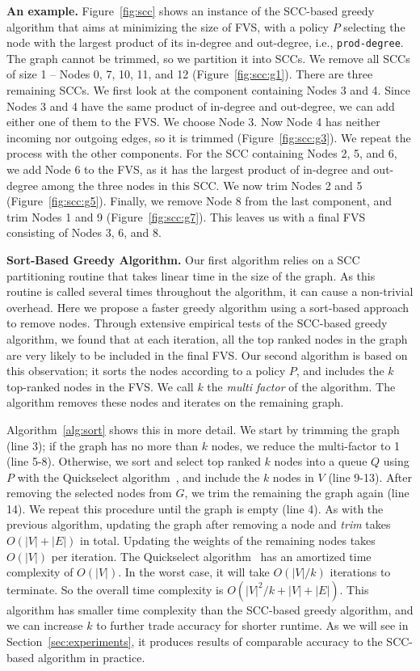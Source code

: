 {\bf An example.} Figure~\ref{fig:scc} shows an instance of the SCC-based greedy algorithm that aims at minimizing the size of FVS, with a policy $P$ selecting the node with the largest product of its in-degree and out-degree, i.e., \texttt{prod-degree}. The graph cannot be trimmed, so we partition it into SCCs. We remove all SCCs of size 1 --  Nodes 0, 7, 10, 11, and 12 (Figure~\ref{fig:scc:g1}). There are three remaining SCCs. We first look at the component containing Nodes 3 and 4. Since Nodes 3 and 4 have the same product of in-degree and out-degree, we can add either one of them to the FVS. We choose Node 3. Now Node 4 has neither incoming nor outgoing edges, so it is trimmed (Figure~\ref{fig:scc:g3}). We repeat the process with the other components. For the SCC containing Nodes 2, 5, and 6, we add Node 6 to the FVS, as it has the largest product of in-degree and out-degree among the three nodes in this SCC. We now trim Nodes 2 and 5 (Figure~\ref{fig:scc:g5}). Finally, we remove Node 8 from the last component, and trim Nodes 1 and 9 (Figure~\ref{fig:scc:g7}). This leaves us with a final FVS consisting of Nodes 3, 6, and 8.

{\bf Sort-Based Greedy Algorithm.} Our first algorithm relies on a SCC partitioning routine that takes linear time in the size of the graph. As this routine is called several times throughout the algorithm, it can cause a non-trivial overhead. Here we propose a faster greedy algorithm using a sort-based approach to remove nodes. Through extensive empirical tests of the SCC-based greedy algorithm, we found that at each iteration, all the top ranked nodes in the graph are very likely to be included in the final FVS. Our second algorithm is based on this observation; it sorts the nodes according to a policy $P$, and includes the $k$ top-ranked nodes in the FVS. We call $k$ the \emph{multi factor} of the algorithm. The algorithm removes these nodes and iterates on the remaining graph.

Algorithm~\ref{alg:sort} shows this in more detail. We start by trimming the graph (line 3); if the graph has no more than $k$ nodes, we reduce the multi-factor to 1 (line 5-8). Otherwise, we sort and select top ranked $k$ nodes into a queue $Q$ using $P$ with the Quickselect algorithm~\cite{hoare61cacm}, and include the $k$ nodes in $V$ (line 9-13).
After removing the selected nodes from $G$, we trim the remaining the graph
again (line 14). We repeat this procedure until the graph is empty (line 4). 
As with the previous algorithm, updating the graph after removing a node and \emph{trim} takes $O(|V|+|E|)$ in total. Updating the weights of the remaining nodes takes $O(|V|)$ per iteration. The
Quickselect algorithm~\cite{hoare61cacm} has an amortized time complexity of
$O(|V|)$. In the worst case, it will take $O(|V|/k)$ iterations to terminate. So
the overall time complexity is $O(|V|^2/k + |V| + |E|)$.
This algorithm has smaller time complexity than the SCC-based greedy algorithm, and we can increase $k$ to further trade accuracy for shorter runtime. As we will see in Section~\ref{sec:experiments}, it produces results of comparable accuracy to the SCC-based algorithm in practice.

